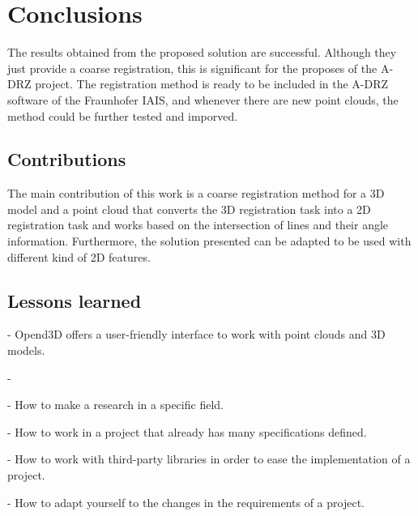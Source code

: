 

    \chapter{Conclusions}

    The results obtained from the proposed solution are successful. 
    Although they just provide a coarse registration, this is significant for the proposes of the A-DRZ project.
    The registration method is ready to be included in the A-DRZ software of the Fraunhofer IAIS,
    and whenever there are new point clouds, the method could be further tested and imporved.

    \section{Contributions}
        The main contribution of this work is a coarse registration method for a 3D model and a point cloud
        that converts the 3D registration task into a 2D registration task and works based on the intersection of lines and their angle information.
        Furthermore, the solution presented can be adapted to be used with different kind of 2D features. 

    \section{Lessons learned}
        - Opend3D offers a user-friendly interface to work with point clouds and 3D models. \par
        -

        - How to make a research in a specific field. \par
        - How to work in a project that already has many specifications defined. \par
        - How to work with third-party libraries in order to ease the implementation of a project. \par
        - How to adapt yourself to the changes in the requirements of a project. \par
    
